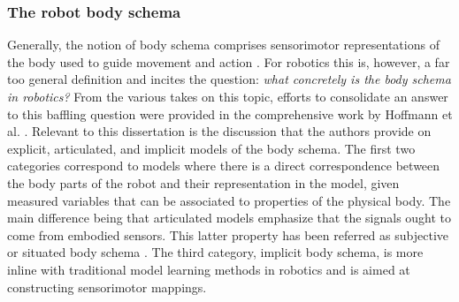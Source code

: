 \subsubsection{The robot body schema}
Generally, the notion of body schema comprises sensorimotor representations of the body used to guide movement and action \cite{Asada2018168Proprioceptionbodyschema}. For robotics this is, however, a far too general definition and incites the question: \textit{what concretely is the body schema in robotics?} From the various takes on this topic, efforts to consolidate an answer to this baffling question were provided in the comprehensive work by Hoffmann et al. \cite{Hoffmann2010Bodyschemarobotics}. Relevant to this dissertation is the discussion that the authors provide on explicit, articulated, and implicit models of the body schema. The first two categories correspond to models where there is a direct correspondence between the body parts of
the robot and their representation in the model, given measured variables that can be associated to properties of the physical body. The main difference being that articulated models \cite{Grush2004emulationtheoryrepresentation} emphasize that the signals ought to come from embodied sensors. This latter property has been referred as subjective or situated body schema \cite{Hersch2008Onlinelearningbody}. The third category, implicit body schema, is more inline with traditional model learning methods in robotics and is aimed at constructing sensorimotor mappings.


